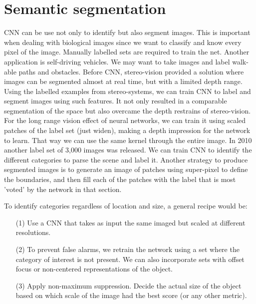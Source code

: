 \section{Semantic segmentation}
\noindent
CNN can be use not only to identify but also segment images. This is important when dealing with biological images since we want to classify and know every pixel of the image. Manually labelled sets are required to train the net. Another application is self-driving vehicles. We may want to take images and label walk-able paths and obstacles. Before CNN, stereo-vision provided a solution where images can be segmented almost at real time, but with a limited depth range. Using the labelled examples from stereo-systems, we can train CNN to label and segment images using such features. It not only resulted in a comparable segmentation of the space but also overcame the depth restrains of stereo-vision. For the long range vision effect of neural networks, we can train it using scaled patches of the label set (just widen), making a depth impression for the network to learn. That way we can use the same kernel through the entire image. In 2010 another label set of 3,000 images was released. We can train CNN to identify the different categories to parse the scene and label it. Another strategy to produce segmented images is to generate an image of patches using super-pixel to define the boundaries, and then fill each of the patches with the label that is most 'voted' by the network in that section. 

\noindent
To identify categories regardless of location and size, a general recipe would be:
\begin{itemize}
\item[(1)] Use a CNN that takes as input the same imaged but scaled at different resolutions. 
\item[(2)] To prevent false alarms, we retrain the network using a set where the category of interest is not present. We can also incorporate sets with offset focus or non-centered representations of the object. 
\item[(3)] Apply non-maximum suppression. Decide the actual size of the object based on which scale of the image had the best score (or any other metric). 
\end{itemize}
